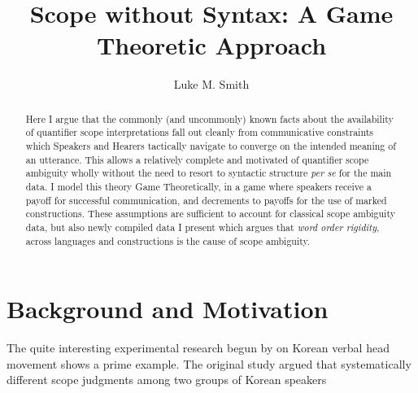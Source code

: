 \documentclass{article}
\title{Scope without Syntax: A Game Theoretic Approach}
\author{Luke M. Smith}
\begin{document}
\maketitle

\begin{abstract}
	Here I argue that the commonly (and uncommonly) known facts about the availability of quantifier scope interpretations fall out cleanly from communicative constraints which Speakers and Hearers tactically navigate to converge on the intended meaning of an utterance.
	This allows a relatively complete and motivated of quantifier scope ambiguity wholly without the need to resort to syntactic structure \textit{per se} for the main data.
	I model this theory Game Theoretically, in a game where speakers receive a payoff for successful communication, and decrements to payoffs for the use of marked constructions.
	These assumptions are sufficient to account for classical scope ambiguity data, but also newly compiled data I present which argues that \emph{word order rigidity}, across languages and constructions is the cause of scope ambiguity.
\end{abstract}




\section{Background and Motivation}

The quite interesting experimental research begun by \textcite{han07} on Korean verbal head movement shows a prime example.
The original study argued that systematically different scope judgments among two groups of Korean speakers
\end{document}

